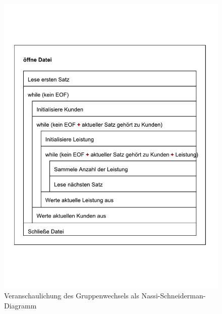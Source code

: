 \begin{figure}[!h]
    \centering
    \includegraphics[width=\textwidth,height=\textheight,keepaspectratio]{images/Gruppenwechsel-NSD.pdf}
    \caption{
        Veranschaulichung des Gruppenwechsels als Nassi-Schneiderman-Diagramm
    }
    \label{fig:diagramm2}
\end{figure}

